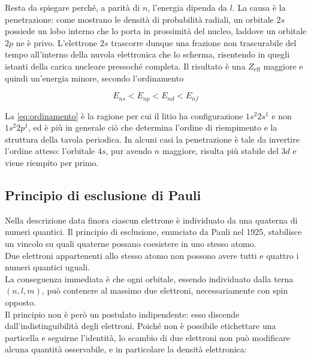 Resta da spiegare perché, a parità di $n$, l'energia dipenda da $l$. 
La causa è la penetrazione: come mostrano le densità di probabilità radiali, un orbitale $2s$ possiede un lobo interno che lo porta in prossimità del nucleo, laddove un orbitale $2p$ ne è privo. L'elettrone $2s$ trascorre dunque una frazione non trascurabile del tempo all'interno della nuvola elettronica che lo scherma, risentendo in quegli istanti della carica nucleare pressoché completa. Il risultato è una $Z_{\text{eff}}$ maggiore e quindi un'energia minore, secondo l'ordinamento

\begin{equation}
    E_{ns} < E_{np} < E_{nd} < E_{nf}
    \label{eq:ordinamento}
\end{equation}

La \eqref{eq:ordinamento} è la ragione per cui il litio ha configurazione $1s^2 2s^1$ e non $1s^2 2p^1$, ed è più in generale ciò che determina l'ordine di riempimento e la struttura della tavola periodica. In alcuni casi la penetrazione è tale da invertire l'ordine atteso: l'orbitale $4s$, pur avendo $n$ maggiore, risulta più stabile del $3d$ e viene riempito per primo.

\newpage

\subsection{Principio di esclusione di Pauli}

Nella descrizione data finora ciascun elettrone è individuato da una quaterna di numeri quantici. Il principio di esclusione, enunciato da Pauli nel 1925, stabilisce un vincolo su quali quaterne possano coesistere in uno stesso atomo.\\

Due elettroni appartenenti allo stesso atomo non possono avere tutti e quattro i numeri quantici uguali.\\

La conseguenza immediata è che ogni orbitale, essendo individuato dalla terna $(n,l,m)$, può contenere al massimo due elettroni, necessariamente con spin opposto.\\

Il principio non è però un postulato indipendente: esso discende dall'indistinguibilità degli elettroni. Poiché non è possibile etichettare una particella e seguirne l'identità, lo scambio di due elettroni non può modificare alcuna quantità osservabile, e in particolare la densità elettronica:

